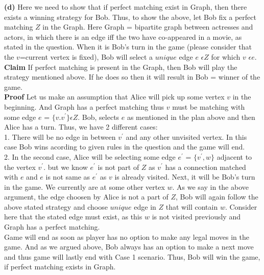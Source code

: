 \documentclass[11pt]{article}
\renewcommand\part[1]{\vspace{.10in}\textbf{(#1)}}
\begin{document}
\part{d}
Here we need to show that if perfect matching exist in Graph, then  there exists a winning strategy for Bob. Thus, to show the above, let Bob fix a perfect matching $Z$ in the Graph. Here Graph = bipartite graph between actresses and actors, in which there is an edge iff the two have co-appeared in a movie, as stated in the question. When it is Bob's turn in the game (please consider that the $v$=current vertex is fixed), Bob will select a $unique$ edge $e$ $\epsilon Z$ for which $v$  $\epsilon e$.\\
{\bf Claim} If perfect matching is present in the Graph, then Bob will play the strategy mentioned above. If he does so then it will result in Bob = winner of the game.\\
{\bf Proof} Let us make an assumption that Alice will pick up some vertex $v$ in the beginning. And Graph has a perfect matching thus $v$ must be matching with some edge $e$ = $\{ v.v^{'}\} \epsilon Z$. Bob, selects $e$ as mentioned in the plan above and then Alice has a turn. Thus, we have 2 different cases:\\
1. There will be no edge in between $v^{'}$ and any other unvisited vertex. In this case Bob wins acording to given rules in the question and the game will end.\\
2. In the second case, Alice will be selecting some edge $e^{'}$ = $ \{ v^{'}, w \}$ adjacent to the vertex $v^{'}$. but we know $e^{'}$ is not part of $Z$ as $v^{'}$ has a connection matched with $e$ and $e$ is not same as $e^{'}$ as $v$ is already visited. Next, it will be Bob's turn in the game. We currently are at some other vertex $w$. As we say in the above argument, the edge choosen by Alice is not a part of $Z$, Bob will again follow the above stated strategy and choose $unique$ edge in $Z$ that will contain $w$. Consider here that the stated edge must exist, as this $w$ is not visited previously and Graph has a perfect matching.\\
Game will end as soon as player has no option to make any legal moves in the game. And as we argued above, Bob always has an option to make a next move and thus game will lastly end with Case 1 scenario. Thus, Bob will win the game, if perfect matching exists in Graph.\\ [15pt]
\end{document}
